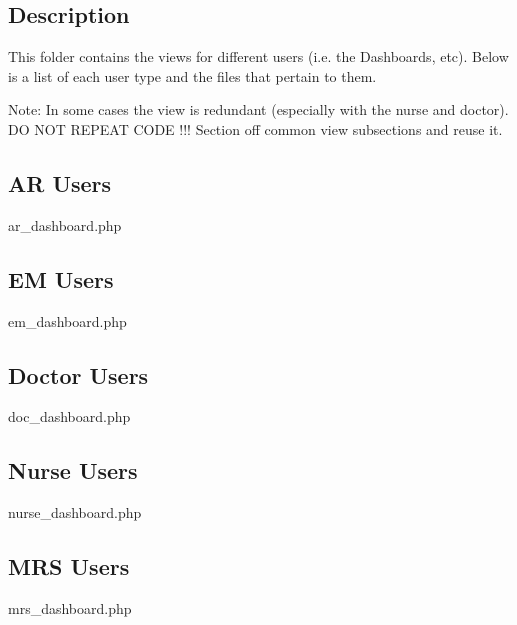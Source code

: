\subsection*{Description}

This folder contains the views for different users (i.\-e. the Dashboards, etc). Below is a list of each user type and the files that pertain to them.

Note\-: In some cases the view is redundant (especially with the nurse and doctor). D\-O N\-O\-T R\-E\-P\-E\-A\-T C\-O\-D\-E !!! Section off common view subsections and reuse it.

\subsection*{A\-R Users}

ar\-\_\-dashboard.\-php

\subsection*{E\-M Users}

em\-\_\-dashboard.\-php

\subsection*{Doctor Users}

doc\-\_\-dashboard.\-php

\subsection*{Nurse Users}

nurse\-\_\-dashboard.\-php

\subsection*{M\-R\-S Users}

mrs\-\_\-dashboard.\-php 